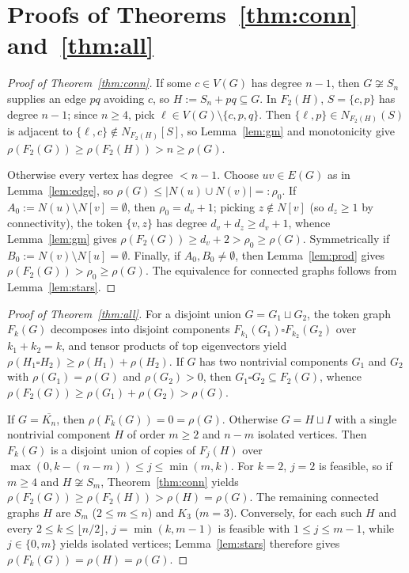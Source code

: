 \documentclass[11pt]{article}
\begin{document}
\section{Proofs of Theorems~\ref{thm:conn} and~\ref{thm:all}}

\begin{proof}[Proof of Theorem~\ref{thm:conn}]
If some $c \in V(G)$ has degree $n - 1$, then $G \not\cong S_n$ supplies an
edge $pq$ avoiding $c$, so $H := S_n + pq \subseteq G$. In $F_2(H)$,
$S = \{c, p\}$ has degree $n - 1$; since $n \ge 4$, pick
$\ell \in V(G) \setminus \{c, p, q\}$. Then $\{\ell, p\} \in N_{F_2(H)}(S)$ is
adjacent to $\{\ell, c\} \notin N_{F_2(H)}[S]$, so Lemma~\ref{lem:gm} and
monotonicity give $\rho(F_2(G)) \ge \rho(F_2(H)) > n \ge \rho(G)$.

Otherwise every vertex has degree $< n - 1$. Choose $uv \in E(G)$ as in
Lemma~\ref{lem:edge}, so $\rho(G) \le |N(u) \cup N(v)| =: \rho_0$. If
$A_0 := N(u) \setminus N[v] = \emptyset$, then $\rho_0 = d_v + 1$; picking
$z \notin N[v]$ (so $d_z \ge 1$ by connectivity), the token $\{v, z\}$ has
degree $d_v + d_z \ge d_v + 1$, whence Lemma~\ref{lem:gm} gives
$\rho(F_2(G)) \ge d_v + 2 > \rho_0 \ge \rho(G)$. Symmetrically if
$B_0 := N(v) \setminus N[u] = \emptyset$. Finally, if $A_0, B_0 \neq \emptyset$,
then Lemma~\ref{lem:prod} gives $\rho(F_2(G)) > \rho_0 \ge \rho(G)$. The
equivalence for connected graphs follows from Lemma~\ref{lem:stars}.
\end{proof}

\begin{proof}[Proof of Theorem~\ref{thm:all}]
For a disjoint union $G = G_1 \sqcup G_2$, the token graph $F_k(G)$ decomposes
into disjoint components $F_{k_1}(G_1) \square F_{k_2}(G_2)$ over
$k_1 + k_2 = k$, and tensor products of top eigenvectors yield
$\rho(H_1 \square H_2) \ge \rho(H_1) + \rho(H_2)$. If $G$ has two nontrivial
components $G_1$ and $G_2$ with $\rho(G_1) = \rho(G)$ and $\rho(G_2) > 0$, then
$G_1 \square G_2 \subseteq F_2(G)$, whence
$\rho(F_2(G)) \ge \rho(G_1) + \rho(G_2) > \rho(G)$.

If $G = \overline{K_n}$, then $\rho(F_k(G)) = 0 = \rho(G)$. Otherwise $G = H \sqcup I$
with a single nontrivial component $H$ of order $m \ge 2$ and $n - m$ isolated
vertices. Then $F_k(G)$ is a disjoint union of copies of $F_j(H)$ over
$\max(0, k - (n - m)) \le j \le \min(m, k)$. For $k = 2$, $j = 2$ is feasible,
so if $m \ge 4$ and $H \not\cong S_m$, Theorem~\ref{thm:conn} yields
$\rho(F_2(G)) \ge \rho(F_2(H)) > \rho(H) = \rho(G)$. The remaining connected
graphs $H$ are $S_m$ ($2 \le m \le n$) and $K_3$ ($m = 3$). Conversely, for
each such $H$ and every $2 \le k \le \lfloor n/2 \rfloor$, $j = \min(k, m - 1)$
is feasible with $1 \le j \le m - 1$, while $j \in \{0, m\}$ yields isolated
vertices; Lemma~\ref{lem:stars} therefore gives $\rho(F_k(G)) = \rho(H) = \rho(G)$.
\end{proof}
\end{document}
